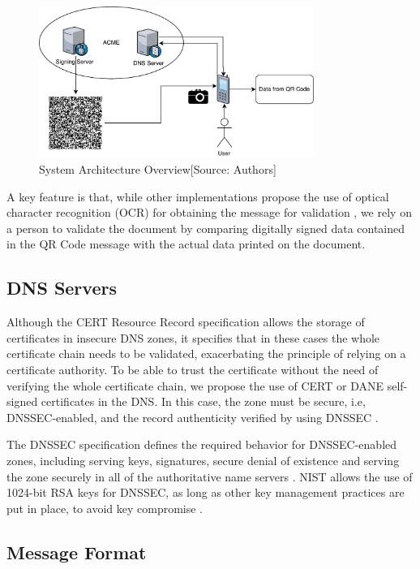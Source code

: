 \documentclass[12pt]{article}
\begin{document}
\begin{figure}[ht]
    \centering
    \includegraphics[width=0.8\textwidth]{overview.pdf}
    \caption{System Architecture Overview[Source: Authors]}
    \label{fig:overview}
\end{figure}

A key feature is that, while other implementations propose the use of optical character recognition (OCR) for obtaining the message for validation \cite{warasart2012based}, we rely on a person to validate the document by comparing digitally signed data contained in the QR Code message with the actual data printed on the document.

\subsection{DNS Servers}

Although the CERT Resource Record specification allows the storage of certificates in insecure DNS zones, it specifies that in these cases the whole certificate chain needs to be validated, exacerbating the principle of relying on a certificate authority. To be able to trust the certificate without the need of verifying the whole certificate chain, we propose the use of CERT or DANE self-signed certificates in the DNS. In this case, the zone must be secure, i.e, DNSSEC-enabled, and the record authenticity verified by using DNSSEC \cite{josefsson2006storing}. 

The DNSSEC specification defines the required behavior for DNSSEC-enabled zones, including serving keys, signatures, secure denial of existence and serving the zone securely in all of the authoritative name servers \cite{osterweil2009deploying}.  NIST allows the use of 1024-bit RSA keys for DNSSEC, as long as other key management practices are put in place, to avoid key compromise \cite{chandramouli2013secure}.

\subsection{Message Format}
\end{document}
